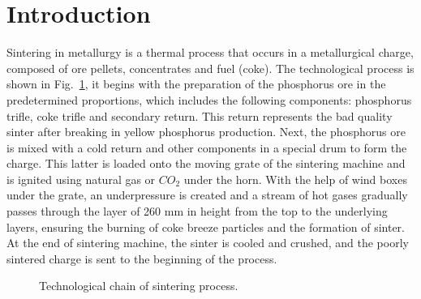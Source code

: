 \documentclass[AMS,STIX2COL]{WileyNJD-v2}
\begin{document}


\section{Introduction}\label{sec1}
Sintering in metallurgy is a thermal process that occurs in a metallurgical charge, composed of ore pellets, concentrates and fuel (coke). The technological process is shown in Fig.~\ref{fig:SinterProcess}, it begins with the preparation of the phosphorus ore in the predetermined proportions, which includes the following components: phosphorus trifle, coke trifle and secondary return. This return represents the bad quality sinter after breaking in yellow phosphorus production. Next, the phosphorus ore is mixed with a cold return and other components in a special drum to form the charge. This latter is loaded onto the moving grate of the sintering machine and is ignited using natural gas or $CO_2$ under the horn. With the help of wind boxes under the grate, an underpressure is created and a stream of hot gases gradually passes through the layer of 260 mm in height from the top to the underlying layers, ensuring the burning of coke breeze particles and the formation of sinter. At the end of sintering machine, the sinter is cooled and crushed, and the poorly sintered charge is sent to the beginning of the process. 

\begin{figure}[htbp]
	\centering
	\caption{Technological chain of sintering process.} \label{fig:SinterProcess}
\end{figure}
\end{document}
